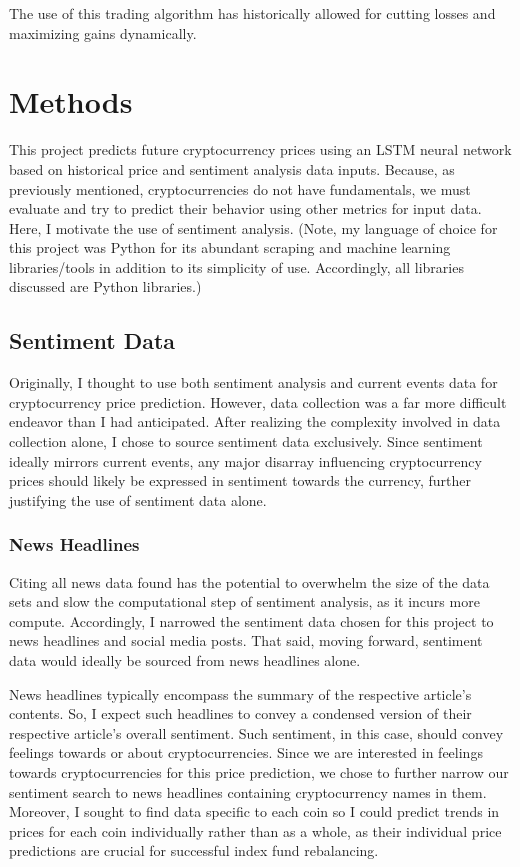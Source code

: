 \documentclass[10pt,twocolumn]{article}
\begin{document}
\noindent The use of this trading algorithm has historically allowed for cutting losses and maximizing gains dynamically.

\section{Methods} \label{methods}

This project predicts future cryptocurrency prices using an LSTM neural network based on historical price and sentiment analysis data inputs. Because, as previously mentioned, cryptocurrencies do not have fundamentals, we must evaluate and try to predict their behavior using other metrics for input data. Here, I motivate the use of sentiment analysis. (Note, my language of choice for this project was Python for its abundant scraping and machine learning libraries/tools in addition to its simplicity of use. Accordingly, all libraries discussed are Python libraries.)

\subsection{Sentiment Data}

Originally, I thought to use both sentiment analysis and current events data for cryptocurrency price prediction. However, data collection was a far more difficult endeavor than I had anticipated. After realizing the complexity involved in data collection alone, I chose to source sentiment data exclusively. Since sentiment ideally mirrors current events, any major disarray influencing cryptocurrency prices should likely be expressed in sentiment towards the currency, further justifying the use of sentiment data alone.

\subsubsection{News Headlines}

Citing all news data found has the potential to overwhelm the size of the data sets and slow the computational step of sentiment analysis, as it incurs more compute. Accordingly, I narrowed the sentiment data chosen for this project to news headlines and social media posts. That said, moving forward, sentiment data would ideally be sourced from news headlines alone.

News headlines typically encompass the summary of the respective article's contents. So, I expect such headlines to convey a condensed version of their respective article's overall sentiment. Such sentiment, in this case, should convey feelings towards or about cryptocurrencies. Since we are interested in feelings towards cryptocurrencies for this price prediction, we chose to further narrow our sentiment search to news headlines containing cryptocurrency names in them. Moreover, I sought to find data specific to each coin so I could predict trends in prices for each coin individually rather than as a whole, as their individual price predictions are crucial for successful index fund rebalancing.
\end{document}
